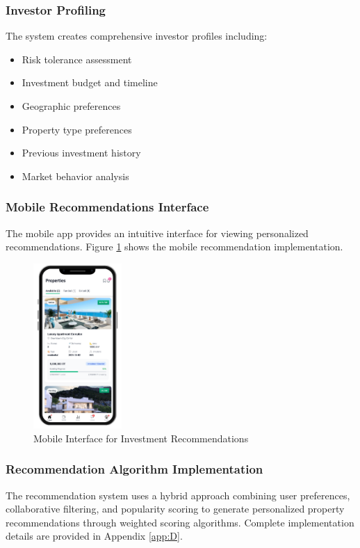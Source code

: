 \subsubsection{Investor Profiling}
The system creates comprehensive investor profiles including:
\begin{itemize}
    \item Risk tolerance assessment
    \item Investment budget and timeline
    \item Geographic preferences
    \item Property type preferences
    \item Previous investment history
    \item Market behavior analysis
\end{itemize}

\subsubsection{Mobile Recommendations Interface}
The mobile app provides an intuitive interface for viewing personalized recommendations. Figure \ref{fig:recommendation-mobile} shows the mobile recommendation implementation.
\newpage
\begin{figure}[htbp]
    \centering
    \includegraphics[width=0.3\textwidth]{images/recommendation_mobile.png}
    \caption{Mobile Interface for Investment Recommendations}
    \label{fig:recommendation-mobile}
\end{figure}

\subsubsection{Recommendation Algorithm Implementation}
The recommendation system uses a hybrid approach combining user preferences, collaborative filtering, and popularity scoring to generate personalized property recommendations through weighted scoring algorithms. Complete implementation details are provided in Appendix \ref{app:D}.


